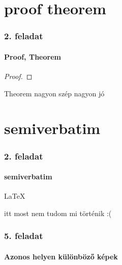 \documentclass[12pt,aspectratoio=169]{beamer}
\begin{document}
\section{proof theorem}
\begin{frame}
\frametitle{2. feladat}
\framesubtitle{Proof, Theorem}

\begin{proof}
\end{proof}
\begin{theorem}
Theorem nagyon szép nagyon jó
\end{theorem}
\end{frame}

\section{semiverbatim}
\begin{frame}
\frametitle{2. feladat}
\framesubtitle{semiverbatim}
\begin{semiverbatim}
\LaTeX

itt most nem tudom mi történik :(
\end{semiverbatim}
\end{frame}

\begin{frame}
\frametitle{5. feladat}
\framesubtitle{Azonos helyen különböző képek}

\begin{columns}[t]
\centering
\end{columns}

\end{frame}
\end{document}
